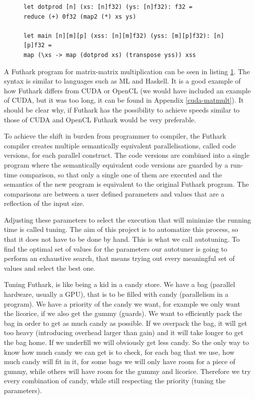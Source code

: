\begin{figure}
\centering
\lstset{language=haskell}
\begin{lstlisting}
let dotprod [n] (xs: [n]f32) (ys: [n]f32): f32 =
reduce (+) 0f32 (map2 (*) xs ys)

let main [n][m][p] (xss: [n][m]f32) (yss: [m][p]f32): [n][p]f32 =
map (\xs -> map (dotprod xs) (transpose yss)) xss
\end{lstlisting}%
\label{IntromatmultFuthark}
\end{figure}
A Futhark program for matrix-matrix multiplication can be seen in listing
\ref{IntromatmultFuthark}. The syntax is similar to languages such as ML and
Haskell. It is a good example of how Futhark differs from CUDA or OpenCL (we
would have included an example of CUDA, but it was too long, it can be found in Appendix
\ref{cuda-matmult}). It should be clear why, if Futhark has the possibility to
achieve speeds similar to those of CUDA and OpenCL Futhark would be very
preferable.

To achieve the shift in burden from programmer to compiler, the Futhark
compiler creates multiple semantically equivalent parallelisations, called code
versions, for each parallel construct. The code versions are combined into
a single program where the semantically equivalent code versions are guarded
by a run-time comparison, so that only a single one of them are executed and the
semantics of the new program is equivalent to the original Futhark program. 
The comparisons are between a user defined parameters and values that are
a reflection of the input size.

Adjusting these parameters to select the execution that will minimize the
running time is called tuning. The aim of this project is to automatize this
process, so that it does not have to be done by hand. This is what we
call autotuning. To find the optimal set of values for the parameters our
autotuner is going to perform an exhaustive search, that means trying out every
meaningful set of values and select the best one.  

Tuning Futhark, is like being a kid in a candy store. We have a bag
(parallel hardware, usually a GPU), that is to be filled
with candy (parallelism in a program). We have a priority of the candy we want, 
for example we only want the licorice, if we also get the gummy (guards). We want to 
efficiently pack the bag in order to get as much candy as possible. If we
overpack the bag, it will get too heavy (introducing overhead larger than gain)
and it will take longer to get the bag home. If we underfill we will
obviously get less candy. So the only way to know how much candy we can get is to check,
for each bag that we use, how much candy will fit in it, for some bags we will only have 
room for a piece of gummy, while others will have room for the gummy and licorice. Therefore
we try every combination of candy, while still respecting the priority 
(tuning the parameters). 
